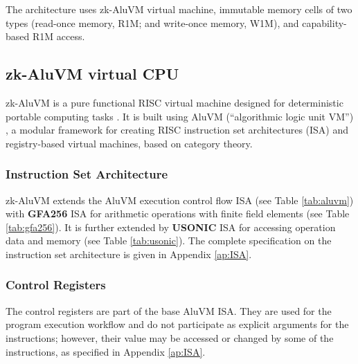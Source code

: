 \documentclass[9pt,oneside]{amsart}
\begin{document}
\begin{multicols}{2}

The architecture uses zk-AluVM virtual machine, immutable memory cells of two types
(read-once memory, R1M; and write-once memory, W1M), and capability-based R1M access.

\subsection{zk-AluVM virtual CPU}\label{AluVM}

zk-AluVM is a pure functional RISC virtual machine
designed for deterministic portable computing tasks \cite{zkAluVM}.
It is built using AluVM (``algorithmic logic unit VM'') \cite{AluVM, AluVMCrate},
a modular framework for creating RISC instruction set architectures (ISA)
and registry-based virtual machines, based on category theory.

\subsubsection{Instruction Set Architecture}

zk-AluVM extends the AluVM execution control flow ISA (see Table \ref{tab:aluvm})
with \textbf{GFA256} ISA for arithmetic operations
with finite field elements (see Table \ref{tab:gfa256}).
It is further extended by \textbf{USONIC} ISA
for accessing operation data and memory (see Table \ref{tab:usonic}).
The complete specification on the instruction set architecture is given in Appendix \ref{ap:ISA}.

\subsubsection{Control Registers}\label{Registers}

The control registers are part of the base AluVM ISA.
They are used for the program execution workflow and do not participate
as explicit arguments for the instructions; however, their value may be accessed or changed
by some of the instructions, as specified in Appendix \ref{ap:ISA}.


\end{multicols}
\end{document}
